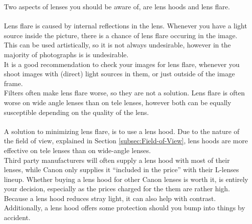 Two aspects of lenses you should be aware of, are lens hoods and lens flare.
\\
\\
Lens flare is caused by internal reflections in the lens. Whenever you have a light source inside the picture, there is a chance of lens flare occuring in the image. This can be used artistically, so it is not always undesirable, however in the majority of photographs is is undesirable.
\\
It is a good recommendation to check your images for lens flare, whenever you shoot images with (direct) light sources in them, or just outside of the image frame.
\\
Filters often make lens flare worse, so they are not a solution. Lens flare is often worse on wide angle lenses than on tele lenses, however both can be equally susceptible depending on the quality of the lens.
\\
\\
A solution to minimizing lens flare, is to use a lens hood. Due to the nature of the field of view, explained in Section \ref{subsec:Field-of-View}, lens hoods are more effective on tele lenses than on wide-angle lenses.
\\
Third party manufacturers will often supply a lens hood with most of their lenses, while Canon only supplies it ``included in the price'' with their L-lenses lineup. Whether buying a lens hood for other Canon lenses is worth it, is entirely your decision, especially as the prices charged for the them are rather high.
\\
Because a lens hood reduces stray light, it can also help with contrast. Additionally, a lens hood offers some protection should you bump into things by accident.